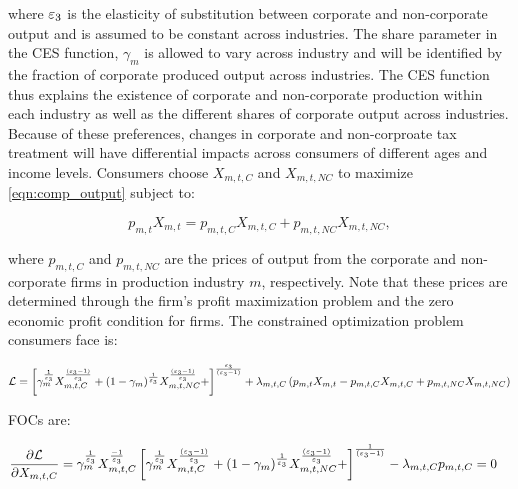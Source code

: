 	\noindent where $\varepsilon_{3}$ is the elasticity of substitution between corporate and non-corporate output and is assumed to be constant across industries.  The share parameter in the CES function, $\gamma_{m}$ is allowed to vary across industry and will be identified by the fraction of corporate produced output across industries.  The CES function thus explains the existence of corporate and non-corporate production within each industry as well as the different shares of corporate output across industries.  Because of these preferences, changes in corporate and non-corproate tax treatment will have differential impacts across consumers of different ages and income levels.  
	Consumers choose $X_{m,t,C}$ and $X_{m,t,NC}$ to maximize \ref{eqn:comp_output} subject to:
	
	 \begin{equation} \label{eqn:comp_output_cons}
             p_{m,t}X_{m,t} = p_{m,t,C}X_{m,t,C}+p_{m,t,NC}X_{m,t,NC}, 
    	\end{equation}
	
	
\noindent where $p_{m,t,C}$ and $p_{m,t,NC}$ are the prices of output from the corporate and non-corporate firms in production industry $m$, respectively.  Note that these prices are determined through the firm's profit maximization problem and the zero economic profit condition for firms. The constrained optimization problem consumers face is: 
    
 \begin{equation} \label{eqn:comp_output_lagrangian}
	\begin{split}
	 \mathcal{L} = \left[\gamma_{m}^{\frac{1}{\varepsilon_{3}}}X_{m,t,C}^{\frac{(\varepsilon_{3}-1)}{\varepsilon_{3}}}+(1-\gamma_{m})^{\frac{1}{\varepsilon_{3}}}X_{m,t,NC}^{\frac{(\varepsilon_{3}-1)}{\varepsilon_{3}}}+\right]^{\frac{\varepsilon_{3}}{(\varepsilon_{3}-1)}} + \lambda_{m,t,C}\left(p_{m,t}X_{m,t} - p_{m,t,C}X_{m,t,C}+p_{m,t,NC}X_{m,t,NC}\right)
  	\end{split}
\end{equation}
    
    FOCs are:
    
\begin{equation} \label{eqn:comp_output_foc_C}
	\begin{split}
       	&  \frac{\partial \mathcal{L}}{\partial X_{m,t,C}} = \gamma_{m}^{\frac{1}{\varepsilon_{3}}} X_{m,t,C}^{\frac{-1}{\varepsilon_{3}}} \left[\gamma_{m}^{\frac{1}{\varepsilon_{3}}}X_{m,t,C}^{\frac{(\varepsilon_{3}-1)}{\varepsilon_{3}}}+(1-\gamma_{m})^{\frac{1}{\varepsilon_{3}}}X_{m,t,NC}^{\frac{(\varepsilon_{3}-1)}{\varepsilon_{3}}}+\right]^{\frac{1}{(\varepsilon_{3}-1)}} - \lambda_{m,t,C} p_{m,t,C} = 0
      	 \end{split}
\end{equation}
    
